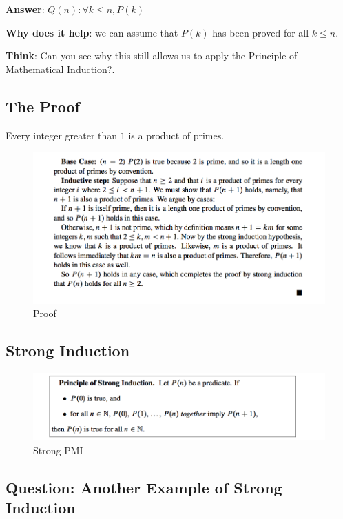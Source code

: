 \documentclass[11pt]{article}
\makeatletter
\def\maxwidth{\ifdim\Gin@nat@width>\linewidth\linewidth
     \else\Gin@nat@width\fi}
\let\Oldincludegraphics\includegraphics
\renewcommand{\includegraphics}[1]{\Oldincludegraphics[width=.8\maxwidth]{#1}}
\makeatother
\begin{document}
     \textbf{Answer}: \(Q(n): \forall k \leq n, P(k)\)
 
 \textbf{Why does it help}: we can assume that \(P(k)\) has been proved
 for all \(k \leq n\).
 
 \textbf{Think}: Can you see why this still allows us to apply the
 Principle of Mathematical Induction?.
 
     \subsection{The Proof}\label{the-proof}
 
 \begin{theorem}
 Every integer greater than $1$ is a product of primes.
 \end{theorem}
 
 \begin{figure}
 \centering
 \includegraphics{images/L13/strongproof.png}
 \caption{Proof}
 \end{figure}
 
     \subsection{Strong Induction}\label{strong-induction}
 
 \begin{figure}
 \centering
 \includegraphics{images/L13/strong.png}
 \caption{Strong PMI}
 \end{figure}
 
     \subsection{Question: Another Example of Strong
 Induction}\label{question-another-example-of-strong-induction}
 
\end{document}
